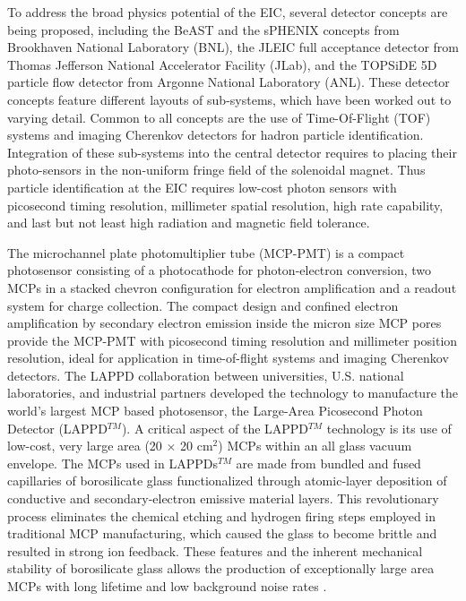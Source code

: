 \documentclass[preprint,5p]{elsarticle}
\begin{document}
To address the broad physics potential of the EIC, 
several detector concepts are being proposed, including the BeAST 
\cite{3} and the sPHENIX  \cite{4} concepts from 
Brookhaven National Laboratory (BNL), the JLEIC full acceptance detector 
\cite{5} from Thomas Jefferson National Accelerator Facility (JLab), and the 
TOPSiDE 5D particle flow detector \cite{6} from Argonne National Laboratory 
(ANL).  
These detector concepts feature different layouts of 
sub-systems, which have been worked out to varying detail.  
Common to all concepts are the use of  
Time-Of-Flight (TOF) systems and imaging Cherenkov detectors for hadron 
particle identification. 
Integration of these sub-systems into the central 
detector requires to placing their photo-sensors in the non-uniform fringe field 
of the solenoidal magnet.
Thus particle identification at the EIC requires low-cost photon sensors with picosecond timing 
resolution, millimeter spatial resolution, high rate capability, and last but not least
high radiation and magnetic field tolerance.

The microchannel plate photomultiplier tube (MCP-PMT) \cite{7} is a compact 
photosensor consisting of a photocathode for photon-electron conversion, two 
MCPs in a stacked chevron configuration for electron amplification and a 
readout system for charge collection. 
The compact design and confined electron 
amplification by secondary electron emission inside the micron size MCP pores 
provide the MCP-PMT with picosecond timing resolution and millimeter position 
resolution, ideal for application in time-of-flight systems and imaging Cherenkov detectors.  
The LAPPD collaboration \cite{8} between universities, U.S.  national 
laboratories, and industrial partners developed the technology to 
manufacture the world’s largest MCP based photosensor, the Large-Area 
Picosecond Photon Detector (LAPPD$^{TM}$). A critical aspect of the LAPPD$^{TM}$ 
technology is its use of low-cost, very large area (20 $\times$ 20 cm$^2$) MCPs \cite{9} 
within an all glass vacuum envelope. 
The MCPs used in LAPPDs$^{TM}$ are made from bundled and fused capillaries of borosilicate glass 
functionalized through atomic-layer deposition \cite{10,11,12} of 
conductive and secondary-electron emissive material layers.
This revolutionary process eliminates the chemical etching and hydrogen firing steps 
employed in traditional MCP manufacturing, which caused the glass to become brittle 
and resulted in strong ion feedback.
These features and the inherent mechanical stability of 
borosilicate glass allows the production of exceptionally large area MCPs 
with long lifetime \cite{13} and low background noise rates \cite{14}. 
\end{document}
